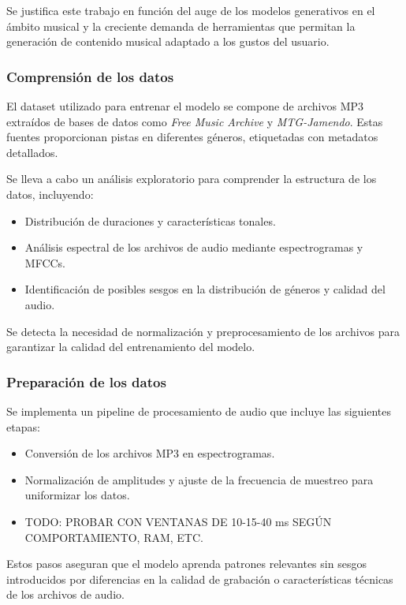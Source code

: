 Se justifica este trabajo en función del auge de los modelos generativos en el ámbito musical y la creciente demanda de herramientas que permitan la generación de contenido musical adaptado a los gustos del usuario.

\subsubsection{Comprensión de los datos}

El dataset utilizado para entrenar el modelo se compone de archivos MP3 extraídos de bases de datos como \textit{Free Music Archive} y \textit{MTG-Jamendo}. Estas fuentes proporcionan pistas en diferentes géneros, etiquetadas con metadatos detallados.

Se lleva a cabo un análisis exploratorio para comprender la estructura de los datos, incluyendo:
\begin{itemize}
    \item Distribución de duraciones y características tonales.
    \item Análisis espectral de los archivos de audio mediante espectrogramas y MFCCs.
    \item Identificación de posibles sesgos en la distribución de géneros y calidad del audio.
\end{itemize}

Se detecta la necesidad de normalización y preprocesamiento de los archivos para garantizar la calidad del entrenamiento del modelo.

\subsubsection{Preparación de los datos}

Se implementa un pipeline de procesamiento de audio que incluye las siguientes etapas:
\begin{itemize}
    \item Conversión de los archivos MP3 en espectrogramas.
    \item Normalización de amplitudes y ajuste de la frecuencia de muestreo para uniformizar los datos.
    \item TODO: PROBAR CON VENTANAS DE 10-15-40 ms SEGÚN COMPORTAMIENTO, RAM, ETC.
\end{itemize}

Estos pasos aseguran que el modelo aprenda patrones relevantes sin sesgos introducidos por diferencias en la calidad de grabación o características técnicas de los archivos de audio.

